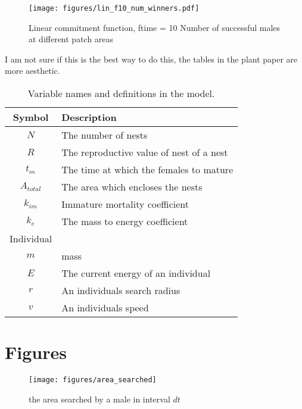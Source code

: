\documentclass[a4paper,11pt]{article}
\begin{document}
\begin{figure}[h!]
    \centering
    \texttt{[image: figures/lin\_f10\_num\_winners.pdf]}
    \caption{Linear commitment function, ftime = 10 Number of successful males at different patch areas}
    \label{fig:num winners expf10}
\end{figure}


\clearpage


I am not sure if this is the best way to do this, the tables in the plant paper are more aesthetic.\\

\begin{table}[h!]
    \caption{Variable names and definitions in the model.}
    \centering
    \begin{tabular}{c | l }
        \hline
        Symbol & Description\\
        \hline
        \hline
        $N$ &  The number of nests \\
        $R$ &  The reproductive value of nest of a nest\\
        $t_m$  & The time at which the females to mature\\
        $A_{total}$ & The area which encloses the nests\\
        \hline
        $k_{im}$ & Immature mortality coefficient \\
        $k_e$ & The mass to energy coefficient \\
        \hline
        Individual & \\
        \hline
        $m$ & mass\\
        $E$ & The current energy of an individual\\
        $r$ & An individuals search radius\\
        $v$ & An individuals speed\\ 
        \hline
    \end{tabular}
\end{table}
    

    
\section{Figures}

\begin{figure}[h!]
\centering
\texttt{[image: figures/area\_searched]}
\caption{the area searched by a male in interval $dt$}
\label{fig:area searched figure}
\end{figure}
\clearpage


\end{document}
